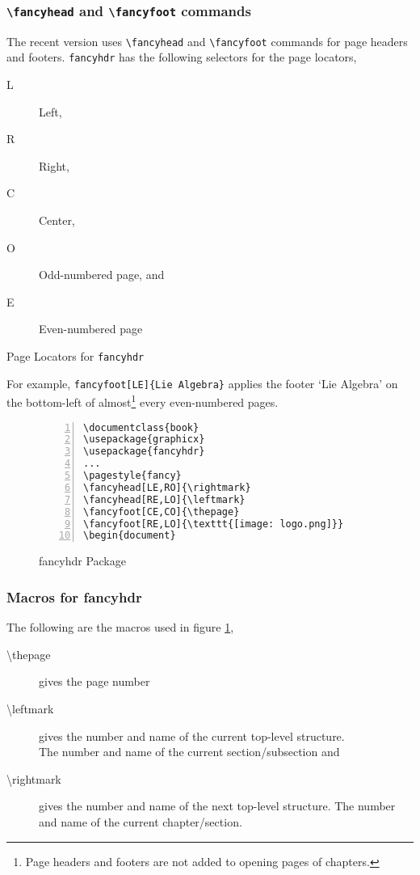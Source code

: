 \documentclass{article}
\begin{document}
\subsubsection{\texttt{\textbackslash fancyhead} and \texttt{\textbackslash fancyfoot} commands}
	The recent version uses \texttt{\textbackslash fancyhead} and \texttt{\textbackslash fancyfoot} commands for page headers and footers. \texttt{fancyhdr} has the following selectors for the page locators,
\begin{table}[h]
\centering
\begin{minipage}{0.45\textwidth}
\begin{description} 
	\item[L] Left,
	\item[R] Right,
	\item[C] Center,
\end{description}
\end{minipage}
\begin{minipage}{0.45\textwidth}
\begin{description} 
	\item[O] Odd-numbered page, and
	\item[E] Even-numbered page
\end{description}
\end{minipage}
\caption{Page Locators for \texttt{fancyhdr}}
\end{table}

	For example, \texttt{fancyfoot[LE]\{Lie Algebra\}} applies the footer `Lie Algebra' on the bottom-left of almost\footnote{Page headers and footers are not added to opening pages of chapters.} every even-numbered pages.

\begin{figure}[h]
\centering
\begin{Verbatim}[numbers = left]
\documentclass{book}
\usepackage{graphicx}
\usepackage{fancyhdr}
...
\pagestyle{fancy}
\fancyhead[LE,RO]{\rightmark}
\fancyhead[RE,LO]{\leftmark}
\fancyfoot[CE,CO]{\thepage}
\fancyfoot[RE,LO]{\texttt{[image: logo.png]}}
\begin{document}
\end{Verbatim}
\caption{fancyhdr Package}
\label{fig:fancyhdr}
\end{figure}

\subsubsection{Macros for fancyhdr}
The following are the macros used in figure \ref{fig:fancyhdr},
\begin{description}
	\item[\textbackslash thepage] gives the page number
	\item[\textbackslash leftmark] gives the number and name of the current top-level structure.\\ The number and name of the current section/subsection and
	\item[\textbackslash rightmark] gives the number and name of the next top-level structure. The number and name of the current chapter/section.
\end{description}
\end{document}
